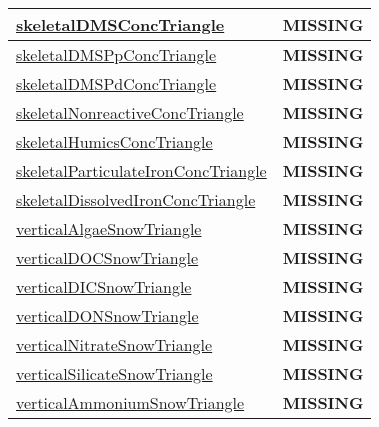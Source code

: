 {\begin{center}
\begin{longtable}{| p{2.0in} | p{4.0in} |}
    \hline
    \hyperref[subsec:var_sec_tracer_triangles_skeletalDMSConcTriangle]{skeletalDMSConcTriangle} & {\bf \color{red} MISSING} \\
    \hline
    \hyperref[subsec:var_sec_tracer_triangles_skeletalDMSPpConcTriangle]{skeletalDMSPpConcTriangle} & {\bf \color{red} MISSING} \\
    \hline
    \hyperref[subsec:var_sec_tracer_triangles_skeletalDMSPdConcTriangle]{skeletalDMSPdConcTriangle} & {\bf \color{red} MISSING} \\
    \hline
    \hyperref[subsec:var_sec_tracer_triangles_skeletalNonreactiveConcTriangle]{skeletalNonreactiveConcTriangle} & {\bf \color{red} MISSING} \\
    \hline
    \hyperref[subsec:var_sec_tracer_triangles_skeletalHumicsConcTriangle]{skeletalHumicsConcTriangle} & {\bf \color{red} MISSING} \\
    \hline
    \hyperref[subsec:var_sec_tracer_triangles_skeletalParticulateIronConcTriangle]{skeletalParticulateIronConc\-Triangle} & {\bf \color{red} MISSING} \\
    \hline
    \hyperref[subsec:var_sec_tracer_triangles_skeletalDissolvedIronConcTriangle]{skeletalDissolvedIronConc\-Triangle} & {\bf \color{red} MISSING} \\
    \hline
    \hyperref[subsec:var_sec_tracer_triangles_verticalAlgaeSnowTriangle]{verticalAlgaeSnowTriangle} & {\bf \color{red} MISSING} \\
    \hline
    \hyperref[subsec:var_sec_tracer_triangles_verticalDOCSnowTriangle]{verticalDOCSnowTriangle} & {\bf \color{red} MISSING} \\
    \hline
    \hyperref[subsec:var_sec_tracer_triangles_verticalDICSnowTriangle]{verticalDICSnowTriangle} & {\bf \color{red} MISSING} \\
    \hline
    \hyperref[subsec:var_sec_tracer_triangles_verticalDONSnowTriangle]{verticalDONSnowTriangle} & {\bf \color{red} MISSING} \\
    \hline
    \hyperref[subsec:var_sec_tracer_triangles_verticalNitrateSnowTriangle]{verticalNitrateSnowTriangle} & {\bf \color{red} MISSING} \\
    \hline
    \hyperref[subsec:var_sec_tracer_triangles_verticalSilicateSnowTriangle]{verticalSilicateSnowTriangle} & {\bf \color{red} MISSING} \\
    \hline
    \hyperref[subsec:var_sec_tracer_triangles_verticalAmmoniumSnowTriangle]{verticalAmmoniumSnowTriangle} & {\bf \color{red} MISSING} \\

\end{longtable}
\end{center}}
